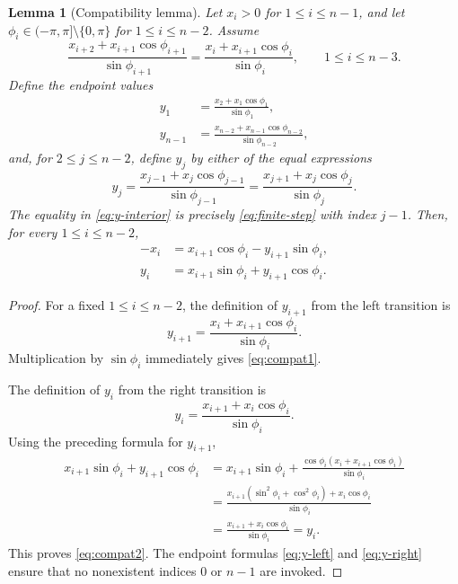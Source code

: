\documentclass[10pt,a4paper]{amsart}
\newtheorem{lemma}[theorem]{Lemma}
\theoremstyle{definition}
\theoremstyle{remark}
\numberwithin{equation}{section}
\begin{document}
\begin{lemma}[Compatibility lemma]\label{lem:compatibility}
Let \(x_i>0\) for \(1\le i\le n-1\), and let
\(\phi_i\in(-\pi,\pi]\setminus\{0,\pi\}\) for \(1\le i\le n-2\).
Assume
\begin{equation}
\frac{x_{i+2}+x_{i+1}\cos\phi_{i+1}}{\sin\phi_{i+1}}
=
\frac{x_i+x_{i+1}\cos\phi_i}{\sin\phi_i},
\qquad 1\le i\le n-3.
\label{eq:finite-step}
\end{equation}
Define the endpoint values
\begin{align}
y_1&=\frac{x_2+x_1\cos\phi_1}{\sin\phi_1},
\label{eq:y-left}\\
y_{n-1}&=\frac{x_{n-2}+x_{n-1}\cos\phi_{n-2}}
{\sin\phi_{n-2}},
\label{eq:y-right}
\end{align}
and, for \(2\le j\le n-2\), define \(y_j\) by either of the equal
expressions
\begin{equation}
y_j=
\frac{x_{j-1}+x_j\cos\phi_{j-1}}{\sin\phi_{j-1}}
=
\frac{x_{j+1}+x_j\cos\phi_j}{\sin\phi_j}.
\label{eq:y-interior}
\end{equation}
The equality in \eqref{eq:y-interior} is precisely
\eqref{eq:finite-step} with index \(j-1\). Then, for every
\(1\le i\le n-2\),
\begin{align}
-x_i&=x_{i+1}\cos\phi_i-y_{i+1}\sin\phi_i,
\label{eq:compat1}\\
y_i&=x_{i+1}\sin\phi_i+y_{i+1}\cos\phi_i.
\label{eq:compat2}
\end{align}
\end{lemma}

\begin{proof}
For a fixed \(1\le i\le n-2\), the definition of \(y_{i+1}\) from the
left transition is
\[
y_{i+1}=
\frac{x_i+x_{i+1}\cos\phi_i}{\sin\phi_i}.
\]
Multiplication by \(\sin\phi_i\) immediately gives
\eqref{eq:compat1}.

The definition of \(y_i\) from the right transition is
\[
y_i=
\frac{x_{i+1}+x_i\cos\phi_i}{\sin\phi_i}.
\]
Using the preceding formula for \(y_{i+1}\),
\begin{align*}
x_{i+1}\sin\phi_i+y_{i+1}\cos\phi_i
&=
x_{i+1}\sin\phi_i+
\frac{\cos\phi_i(x_i+x_{i+1}\cos\phi_i)}{\sin\phi_i}\\
&=
\frac{x_{i+1}(\sin^2\phi_i+\cos^2\phi_i)
+x_i\cos\phi_i}{\sin\phi_i}\\
&=
\frac{x_{i+1}+x_i\cos\phi_i}{\sin\phi_i}
=y_i.
\end{align*}
This proves \eqref{eq:compat2}.  The endpoint formulas
\eqref{eq:y-left} and \eqref{eq:y-right} ensure that no nonexistent
indices \(0\) or \(n-1\) are invoked.
\end{proof}
\end{document}
